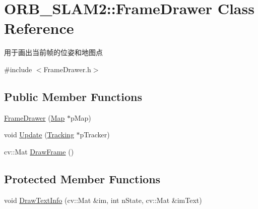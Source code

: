 \hypertarget{class_o_r_b___s_l_a_m2_1_1_frame_drawer}{}\section{O\+R\+B\+\_\+\+S\+L\+A\+M2\+:\+:Frame\+Drawer Class Reference}
\label{class_o_r_b___s_l_a_m2_1_1_frame_drawer}


用于画出当前帧的位姿和地图点  




{\ttfamily \#include $<$Frame\+Drawer.\+h$>$}

\subsection*{Public Member Functions}
\begin{DoxyCompactItemize}
\item 
\mbox{\hyperlink{class_o_r_b___s_l_a_m2_1_1_frame_drawer_add0e1c3734c200a959d8ed9f225223db}{Frame\+Drawer}} (\mbox{\hyperlink{class_o_r_b___s_l_a_m2_1_1_map}{Map}} $\ast$p\+Map)
\item 
void \mbox{\hyperlink{class_o_r_b___s_l_a_m2_1_1_frame_drawer_ad1bba97371be98ccab373bab862cf964}{Update}} (\mbox{\hyperlink{class_o_r_b___s_l_a_m2_1_1_tracking}{Tracking}} $\ast$p\+Tracker)
\item 
cv\+::\+Mat \mbox{\hyperlink{class_o_r_b___s_l_a_m2_1_1_frame_drawer_a7d2b0099c169f6944cadc2cd574a06de}{Draw\+Frame}} ()
\end{DoxyCompactItemize}
\subsection*{Protected Member Functions}
\begin{DoxyCompactItemize}
\item 
void \mbox{\hyperlink{class_o_r_b___s_l_a_m2_1_1_frame_drawer_a059f66cfb0702264c788a79313ec3630}{Draw\+Text\+Info}} (cv\+::\+Mat \&im, int n\+State, cv\+::\+Mat \&im\+Text)
\end{DoxyCompactItemize}
